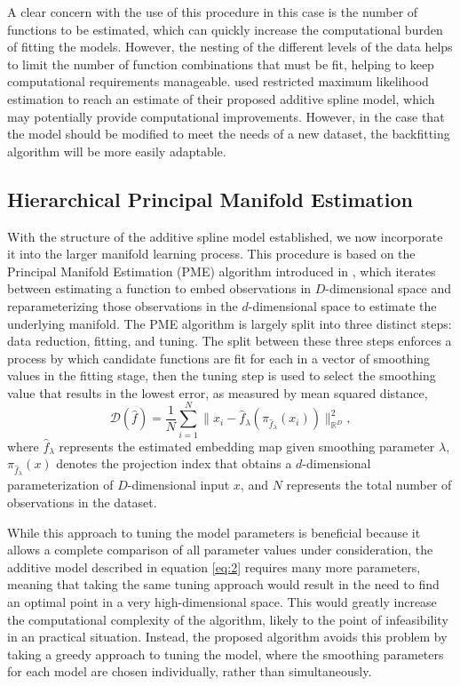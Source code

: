 \documentclass[11pt,reqno]{article}
\theoremstyle{definition}
\begin{document}
A clear concern with the use of this procedure in this case is the number of functions to be estimated, which can quickly increase the computational burden of fitting the models. However, the nesting of the different levels of the data helps to limit the number of function combinations that must be fit, helping to keep computational requirements manageable. \cite{brumbackSmoothingSplineModels1998} used restricted maximum likelihood estimation to reach an estimate of their proposed additive spline model, which may potentially provide computational improvements. However, in the case that the model should be modified to meet the needs of a new dataset, the backfitting algorithm will be more easily adaptable. 

\subsection{Hierarchical Principal Manifold Estimation}

With the structure of the additive spline model established, we now incorporate it into the larger manifold learning process. This procedure is based on the Principal Manifold Estimation (PME) algorithm introduced in \cite{mengPrincipalManifoldEstimation2021}, which iterates between estimating a function to embed observations in $D$-dimensional space and reparameterizing those observations in the $d$-dimensional space to estimate the underlying manifold. The PME algorithm is largely split into three distinct steps: data reduction, fitting, and tuning. The split between these three steps enforces a process by which candidate functions are fit for each in a vector of smoothing values in the fitting stage, then the tuning step is used to select the smoothing value that results in the lowest error, as measured by mean squared distance,
\[%
  \mathcal{D}(\hat{f}) = \frac{1}{N}\sum_{i=1}^{N}\|x_i - \hat{f}_\lambda\left(\pi_{\hat{f}_\lambda}(x_i)\right)\|_{\mathbb{R}^{D}}^2
,\]%
where $\hat{f}_\lambda$ represents the estimated embedding map given smoothing parameter $\lambda$, $\pi_{\hat{f}_\lambda}(x)$ denotes the projection index that obtains a $d$-dimensional parameterization of $D$-dimensional input $x$, and $N$ represents the total number of observations in the dataset.

While this approach to tuning the model parameters is beneficial because it allows a complete comparison of all parameter values under consideration, the additive model described in equation \ref{eq:2} requires many more parameters, meaning that taking the same tuning approach would result in the need to find an optimal point in a very high-dimensional space. This would greatly increase the computational complexity of the algorithm, likely to the point of infeasibility in an practical situation. Instead, the proposed algorithm avoids this problem by taking a greedy approach to tuning the model, where the smoothing parameters for each model are chosen individually, rather than simultaneously. 
\end{document}
